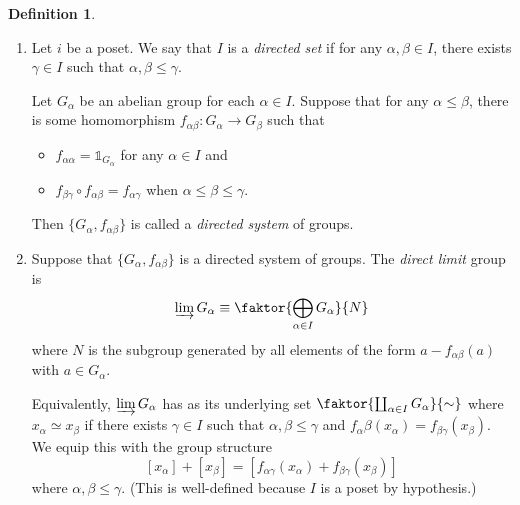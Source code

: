 \documentclass[10pt,letterpaper,cm]{nupset}
\theoremstyle{definition}
\newtheorem{definition}{Definition}[subsection]
\theoremstyle{theorem}
\theoremstyle{remark}
\newcommand{\1}{\mathbb{1}}
\newcommand{\0}{\vec 0}
\begin{document}
\begin{definition} $ $
\begin{enumerate}
\item Let $i$ be a poset. We say that $I$ is a \textit{directed set} if for any $\alpha, \beta \in I$, there exists $\gamma \in I$ such that $\alpha, \beta \leq \gamma$. 

Let $G_{\alpha}$ be an abelian group for each $\alpha \in I$. Suppose that for any $\alpha \leq \beta$, there is some homomorphism $f_{\alpha{\beta}} : G_{\alpha} \to G_{\beta}$ such that 
\begin{itemize}
\item $f_{\alpha{\alpha}} = \1_{G_{\alpha}}$ for any $\alpha \in I$ and 
\item $f_{\beta{\gamma}}\circ f_{\alpha{\beta}} = f_{\alpha{\gamma}}$ when $\alpha \leq \beta \leq \gamma$. 
\end{itemize}
Then $\{G_{\alpha}, f_{\alpha{\beta}}\}$ is called a \textit{directed system} of groups. 
\item Suppose that $\{G_{\alpha},  f_{\alpha{\beta}}\}$ is a directed system of groups. The \textit{direct limit} group is $$\varinjlim G_{\alpha} \equiv \faktor{\bigoplus_{\alpha \in I}G_{\alpha}}{N}$$ where $N$ is the subgroup generated by all elements of the form $a-f_{\alpha{\beta}}(a)$ with $a\in G_{\alpha}$. 

Equivalently, $\varinjlim G_{\alpha}$ has as its underlying set $\faktor{\coprod_{\alpha \in I} G_{\alpha}}{\sim}$ where $x_{\alpha} \simeq x_{\beta}$ if there exists $\gamma \in I$ such that $\alpha, \beta \leq \gamma$ and $f_{\alpha}{\beta}(x_{\alpha}) = f_{\beta{\gamma}}(x_{\beta})$. We equip this with the group structure $$[x_{\alpha}] +[x_{\beta}] = [f_{\alpha{\gamma}}(x_{\alpha}) + f_{\beta{\gamma}}(x_{\beta})]$$ where $\alpha, \beta \leq \gamma$. (This is well-defined because $I$ is a poset by hypothesis.)
\end{enumerate}
\end{definition}
\end{document}
